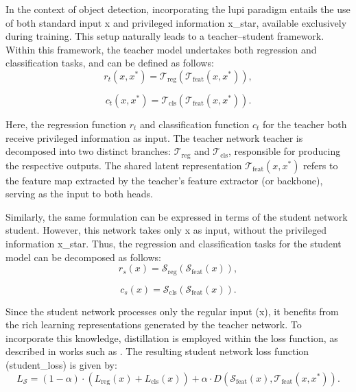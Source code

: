 In the context of object detection, incorporating the \gls{lupi} paradigm entails the use of both standard input \gls{x} and privileged information \gls{x_star}, available exclusively during training. This setup naturally leads to a teacher--student framework. Within this framework, the teacher model undertakes both regression and classification tasks, and can be defined as follows:
\begin{equation} \label{eq:teacher_network_reg}
r_t(x, x^*) = \mathcal{T}_{\text{reg}}(\mathcal{T}_{\text{feat}}(x, x^*)),
\end{equation}

\begin{equation} \label{eq:teacher_network_cls}
c_t(x, x^*) = \mathcal{T}_{\text{cls}}(\mathcal{T}_{\text{feat}}(x, x^*)) .
\end{equation}

\noindent Here, the regression function \( r_t \) and classification function \( c_t \) for the teacher both receive privileged information as input. The teacher network \gls{teacher} is decomposed into two distinct branches: \( \mathcal{T}_{\text{reg}} \) and \( \mathcal{T}_{\text{cls}} \), responsible for producing the respective outputs. The shared latent representation \( \mathcal{T}_{\text{feat}}(x, x^*) \) refers to the feature map extracted by the teacher’s feature extractor (or backbone), serving as the input to both heads.

Similarly, the same formulation can be expressed in terms of the student network \gls{student}. However, this network takes only \gls{x} as input, without the privileged information \gls{x_star}. Thus, the regression and classification tasks for the student model can be decomposed as follows:
\begin{equation} \label{eq:student_network_reg}
r_s(x) = \mathcal{S}_{\text{reg}}(\mathcal{S}_{\text{feat}}(x)),
\end{equation}

\begin{equation} \label{eq:student_network_cls}
c_s(x) = \mathcal{S}_{\text{cls}}(\mathcal{S}_{\text{feat}}(x)).
\end{equation}

\noindent Since the student network processes only the regular input (\gls{x}), it benefits from the rich learning representations generated by the teacher network. To incorporate this knowledge, distillation is employed within the loss function, as described in works such as \cite{lab2wild, lupi, lupi_distillation}. The resulting student network loss function (\gls{student_loss}) is given by:
\begin{equation} \label{eq:lupi_loss_function}
L_{\mathcal{S}} = (1 - \alpha) \cdot ( L_{\text{reg}}(x) + L_{\text{cls}}(x)) + \alpha \cdot D(\mathcal{S}_{\text{feat}}(x), \mathcal{T}_{\text{feat}}(x, x^*)).
\end{equation}

